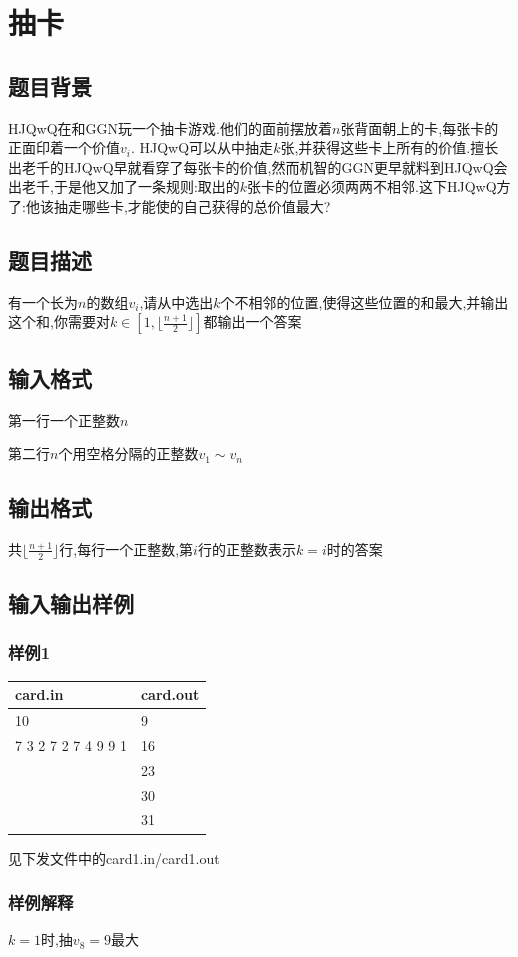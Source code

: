 \documentclass[12pt]{ctexart}
\begin{document}
	\section{抽卡}
	\subsection{题目背景}
	HJQwQ在和GGN玩一个抽卡游戏.他们的面前摆放着$n$张背面朝上的卡,每张卡的正面印着一个价值$v_i$. HJQwQ可以从中抽走$k$张,并获得这些卡上所有的价值.擅长出老千的HJQwQ早就看穿了每张卡的价值,然而机智的GGN更早就料到HJQwQ会出老千,于是他又加了一条规则:取出的$k$张卡的位置必须两两不相邻.这下HJQwQ方了:他该抽走哪些卡,才能使的自己获得的总价值最大?
	\subsection{题目描述}
	有一个长为$n$的数组$v_i$,请从中选出$k$个不相邻的位置,使得这些位置的和最大,并输出这个和,你需要对$k\in\left[1,\lfloor\frac{n+1}2\rfloor\right]$都输出一个答案
	\subsection{输入格式}
	第一行一个正整数$n$

	第二行$n$个用空格分隔的正整数$v_1\sim v_n$
	\subsection{输出格式}
	共$\lfloor\frac{n+1}2\rfloor$行,每行一个正整数,第$i$行的正整数表示$k=i$时的答案
	\subsection{输入输出样例}
	\subsubsection{样例1}
	\begin{center}
		\begin{tabular}{|p{6cm}|p{6cm}|}
			\hline card.in&card.out\\
			\hline	10&9\\
					7 3 2 7 2 7 4 9 9 1&16\\
					&23\\
					&30\\
					&31\\
			\hline
		\end{tabular}
	\end{center}
	见下发文件中的card1.in/card1.out
	\subsubsection{样例解释}
	$k=1$时,抽$v_8=9$最大
\end{document}
